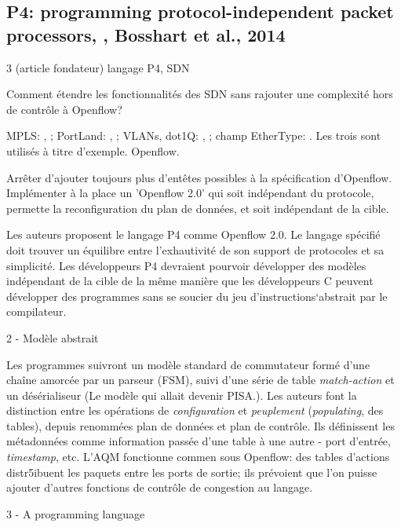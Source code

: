 
\subsection{P4: programming protocol-independent packet processors, \cite{bosshart_p4_2014}, Bosshart et al., 2014}
 3 (article fondateur)
 langage P4, SDN

 Comment étendre les fonctionnalités des SDN sans rajouter une complexité hors de contrôle à Openflow?

 MPLS: \cite{noauthor_micronugget_nodate}, \cite{noauthor_multiprotocol_2023}; PortLand: \cite{noauthor_portland_2009}, \cite{noauthor_understanding_nodate}; VLANs, dot1Q: \cite{noauthor_vlan_2023}, \cite{noauthor_ieee_2022}; champ EtherType: \cite{noauthor_ethertype_2022}. Les trois sont utilisés à titre d'exemple. Openflow.


 Arrêter d'ajouter toujours plus d'entêtes possibles à la spécification d'Openflow. Implémenter à la place un 'Openflow 2.0' qui soit indépendant du protocole, permette la reconfiguration du plan de données, et soit indépendant de la cible.

 Les auteurs proposent le langage P4 comme Openflow 2.0. Le langage spécifié doit trouver un équilibre entre l'exhautivité de son support de protocoles et sa simplicité. Les développeurs P4 devraient pourvoir développer des modèles indépendant de la cible de la même manière que les développeurs C peuvent développer des programmes sans se soucier du jeu d'instructions`abstrait par le compilateur.

2 - Modèle abstrait

Les programmes suivront un modèle standard de commutateur formé d'une chaîne amorcée par un parseur (FSM), suivi d'une série de table \emph{match-action} et un désérialiseur (Le modèle qui allait devenir PISA.). Les auteurs font la distinction entre les opérations de \emph{configuration} et \emph{peuplement} (\emph{populating}, des tables), depuis renommées plan de données et plan de contrôle. Ils définissent les métadonnées comme information passée d'une table à une autre - port d'entrée, \emph{timestamp}, etc. L'AQM fonctionne commen sous Openflow: des tables d'actions distr5ibuent les paquets entre les ports de sortie; ils prévoient que l'on puisse ajouter d'autres fonctions de contrôle de congestion au langage.

3 - A programming language

